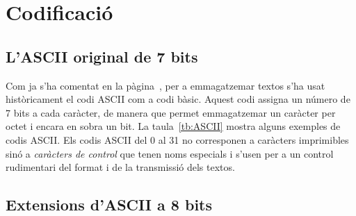 \section{Codificació}

\subsection{L'ASCII original de 7 bits}

Com ja s'ha comentat en la pàgina~\pageref{pg:ASCII}, per a
emmagatzemar textos s'ha usat històricament el codi ASCII com a codi
bàsic. Aquest codi assigna un número de 7 bits a cada caràcter, de
manera que permet emmagatzemar un caràcter per octet i encara en sobra
un bit. La taula~\ref{tb:ASCII} mostra alguns exemples de codis
ASCII. Els codis ASCII del 0 al 31 no corresponen a caràcters
imprimibles sinó a \emph{caràcters de control} que tenen noms
especials i s'usen per a un control rudimentari del format i de la
transmissió dels textos.

\subsection{Extensions d'ASCII a 8 bits}

